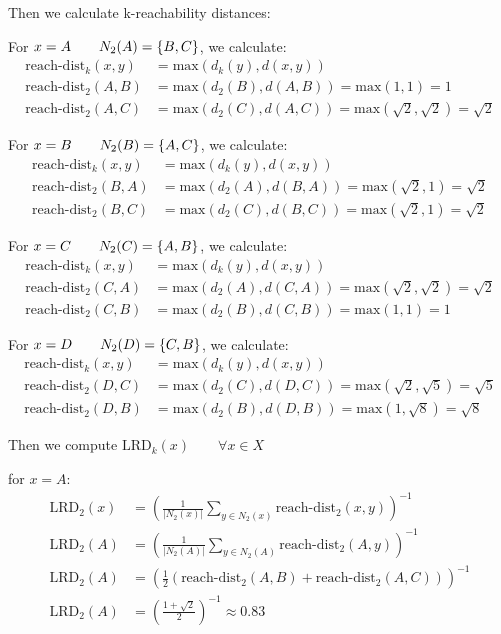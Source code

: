 \documentclass{article}
\begin{document}
Then we calculate k-reachability distances:

For $x=A \qquad N_2(A) = \{B,C\}$, we calculate:
\begin{align*}
\text{reach-dist}_k(x,y) &= \text{max}(d_k(y), d(x,y)) \\
\text{reach-dist}_2(A,B) &= \text{max}(d_2(B), d(A,B)) = \text{max}(1, 1) = 1 \\
\text{reach-dist}_2(A,C) &= \text{max}(d_2(C), d(A,C)) = \text{max}(\sqrt{2}, \sqrt{2}) = \sqrt{2}
\end{align*}

For $x=B \qquad N_2(B) = \{A,C\}$, we calculate:
\begin{align*}
\text{reach-dist}_k(x,y) &= \text{max}(d_k(y), d(x,y)) \\
\text{reach-dist}_2(B,A) &= \text{max}(d_2(A), d(B,A)) = \text{max}(\sqrt{2}, 1) = \sqrt{2} \\
\text{reach-dist}_2(B,C) &= \text{max}(d_2(C), d(B,C)) = \text{max}(\sqrt{2}, 1) = \sqrt{2}
\end{align*}

For $x=C \qquad N_2(C) = \{A,B\}$, we calculate:
\begin{align*}
\text{reach-dist}_k(x,y) &= \text{max}(d_k(y), d(x,y)) \\
\text{reach-dist}_2(C,A) &= \text{max}(d_2(A), d(C,A)) = \text{max}(\sqrt{2}, \sqrt{2}) = \sqrt{2} \\
\text{reach-dist}_2(C,B) &= \text{max}(d_2(B), d(C,B)) = \text{max}(1, 1) = 1
\end{align*}


For $x=D \qquad N_2(D) = \{C,B\}$, we calculate:
\begin{align*}
\text{reach-dist}_k(x,y) &= \text{max}(d_k(y), d(x,y)) \\
\text{reach-dist}_2(D,C) &= \text{max}(d_2(C), d(D,C)) = \text{max}(\sqrt{2}, \sqrt{5}) = \sqrt{5} \\
\text{reach-dist}_2(D,B) &= \text{max}(d_2(B), d(D,B)) = \text{max}(1, \sqrt{8}) = \sqrt{8}
\end{align*}


Then we compute $\text{LRD}_k(x) \qquad \forall x \in X$ 

for $x=A$:
\begin{align*}
\text{LRD}_2(x) &= \left( \frac{1}{|N_2(x)|} \sum_{y \in N_2(x)} \text{reach-dist}_2(x,y) \right)^{-1} \\
\text{LRD}_2(A) &= \left( \frac{1}{|N_2(A)|} \sum_{y \in N_2(A)} \text{reach-dist}_2(A,y) \right)^{-1} \\
\text{LRD}_2(A) &= \left( \frac{1}{2} (\text{reach-dist}_2(A,B) + \text{reach-dist}_2(A,C)) \right)^{-1} \\
\text{LRD}_2(A) &= \left( \frac{1 + \sqrt{2}}{2}\right)^{-1} \approx 0.83
\end{align*}
\end{document}
